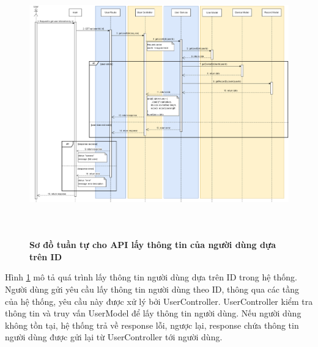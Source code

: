 \begin{figure}[H]
  \centering
  \includegraphics[width=16cm,height=11.5cm]{Images/sequence_api/getUserById.png}
  \caption[Sơ đồ tuần tự cho API lấy thông tin của người dùng dựa trên ID ]{\bfseries \fontsize{12pt}{0pt}
  \selectfont Sơ đồ tuần tự cho API lấy thông tin của người dùng dựa trên ID }
  \label{api_getUserById} %
\end{figure}
Hình \ref{api_getUserById} mô tả quá trình lấy thông tin người dùng dựa trên ID trong hệ thống. Người dùng gửi yêu cầu lấy thông tin người dùng theo ID, thông qua các tầng của hệ thống, yêu cầu này được xử lý bởi UserController. UserController kiểm tra thông tin và truy vấn UserModel để lấy thông tin người dùng. 
Nếu người dùng không tồn tại, hệ thống trả về response lỗi, ngược lại, response chứa thông tin người dùng được gửi lại từ UserController tới người dùng.

